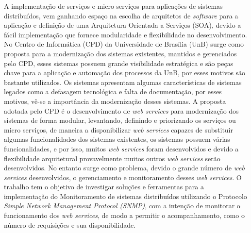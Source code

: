 A implementação de serviços e micro serviços para aplicações de sistemas distribuídos, vem ganhando espaço na escolha de arquitetos de \textit{software} para a aplicação e definição de uma Arquitetura Orientada a Serviços (SOA), devido a fácil implementação que fornece modularidade e flexibilidade no desenvolvimento. No Centro de Informática (CPD) da Universidade de Brasília (UnB) surge como proposta para a modernização dos sistemas existentes, mantidos e gerenciados pelo CPD, esses sistemas possuem grande visibilidade estratégica e são peças chave para a aplicação e automação dos processos da UnB, por esses motivos são bastante utilizados. Os sistemas apresentam algumas características de sistemas legados como a defasagem tecnológica e falta de documentação, por esses motivos, vê-se a importância da modernização desses sistemas. A proposta adotada pelo CPD é o desenvolvimento de \textit{web services} para modernização dos sistemas de forma modular, levantando, definindo e priorizando os serviços ou micro serviços, de maneira a disponibilizar \textit{web services} capazes de substituir algumas funcionalidades dos sistemas existentes, os sistemas possuem várias funcionalidades, e por isso, muitos \textit{web services} foram desenvolvidos e devido a flexibilidade arquitetural provavelmente muitos outros \textit{web services} serão desenvolvidos. No entanto surge como problema, devido o grande número de \textit{web services} desenvolvidos, o gerenciamento e monitoramento desses \textit{web services}. O trabalho tem o objetivo de investigar soluções e ferramentas para a implementação do Monitoramento de sistemas distribuídos utilizando o Protocolo \textit{Simple Network Management Protocol (SNMP)}, com a intenção de monitorar o funcionamento dos \textit{web services}, de modo a permitir o acompanhamento, como o número de requisições e sua disponibilidade. 